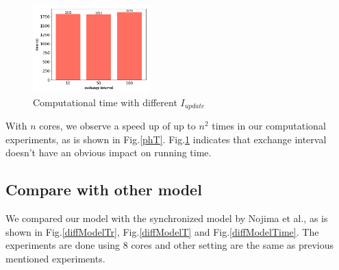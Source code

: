 \documentclass[conference]{IEEEtran}
\begin{document}
\begin{figure}[htbp]
    \centering
    \includegraphics[width=0.4\textwidth]{figures/diffTimeGen.png}
    \caption{Computational time with different $I_{update}$}\label{diffTimeGen}
  \end{figure}

 With $n$ cores, we observe a speed up of up to $n^2$ times in our computational experiments, as is shown in Fig.\ref{phT}. Fig.\ref{diffTimeGen} indicates that exchange interval doesn't have an obvious impact on running time.

\subsection{Compare with other model}
We compared our model with the synchronized model by Nojima et al.\cite{nojima2015application}, as is shown in Fig.\ref{diffModelTr}, Fig.\ref{diffModelT} and Fig.\ref{diffModelTime}. The experiments are done using 8 cores and other setting are the same as previous mentioned experiments.
\end{document}
